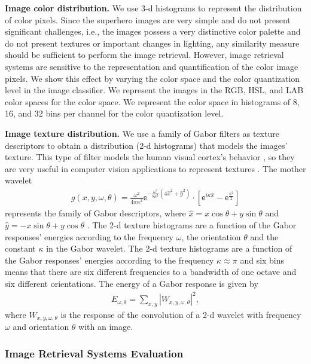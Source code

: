 \textbf{Image color distribution.} We use 3-d histograms to represent the distribution of color pixels. Since the superhero images are very simple and do not present significant challenges, i.e., the images possess a very distinctive color palette and do not present textures or important changes in lighting, any similarity measure should be sufficient to perform the image retrieval. However, image retrieval systems are sensitive to the representation and quantification of the color image pixels. We show this effect by varying the color space and the color quantization level in the image classifier. We represent the images in the RGB, HSL, and LAB color spaces for the color space. We represent the color space in histograms of 8, 16, and 32 bins per channel for the color quantization level.

\textbf{Image texture distribution.} We use a family of Gabor filters as texture descriptors to obtain a distribution (2-d histograms) that models the images' texture. This type of filter models the human visual cortex's behavior \citep{Daugman:TASSP:1988}, so they are very useful in computer vision applications to represent textures \citep{Lee:PAMI:1996}. The mother wavelet
\begin{eqnarray}
 g(x,y,\omega,\theta) = \frac{\omega^2}{4\pi\kappa^2} \mathsf{e}^{-\frac{\omega^2}{8\kappa^2}\left(4\hat{x}^2 + \hat{y}^2\right)} \cdot [\mathsf{e}^{i \kappa \hat{x}} -\mathsf{e}^ {\frac{\kappa ^ 2}{2}} ]  \label{eq:gabor_filters}
\end{eqnarray}
represents the family of Gabor descriptors, where $\hat{x} = x \cos \theta +  y \sin \theta$ and $\hat{y} = -x\sin \theta + y \cos \theta$ . The 2-d texture histograms are a function of the Gabor responses' energies according to the frequency $\omega$, the orientation $\theta$ and the constant $\kappa$ in the Gabor wavelet. The 2-d texture histograms are a function of the Gabor responses' energies according to the frequency  $\kappa \approx \pi$ and six bins means that there are six different frequencies to a bandwidth of one octave and six different orientations. The energy of a Gabor response is given by
\begin{eqnarray} 
 E_{\omega,\theta} = \sum\nolimits_{x, y}|W_{x,y,\omega,\theta}|^2, \label{eq:g_energy}
\end{eqnarray}
where $W_{x,y,\omega,\theta}$ is the response of the convolution of a 2-d wavelet with frequency $\omega$ and orientation $\theta$ with an image. 

\subsubsection{Image Retrieval Systems Evaluation} \label{subsubsec:evaluation}

